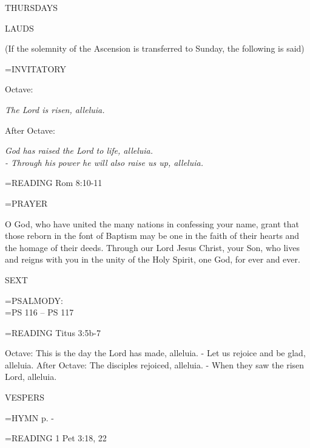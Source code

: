 \begin{center}\normalsize THURSDAYS\\
\end{center}

\begin{flushleft}\normalsize LAUDS\\\end{flushleft}
(If the solemnity of the Ascension is transferred to Sunday, the following is said)

\hangindent=\parindent \small{INVITATORY}
\begin{center}
\end{center}Octave:\begin{center}\textit{	The Lord is risen, alleluia.\\}
\end{center}After Octave:\begin{center}\textit{	God has raised the Lord to life, alleluia.\\}
\textit{- Through his power he will also raise us up, alleluia.\\}
\end{center}

\hangindent=\parindent \small{\uppercase{READING}}    Rom 8:10-11 \textbf{   \\}

\hangindent=\parindent \small PRAYER
\begin{description}[labelindent=\parindent, leftmargin=*]
\item [Octave:] 	O God, who have united the many nations in confessing your name, grant that those reborn in the font of Baptism may be one in the faith of their hearts and the homage of their deeds. Through our Lord Jesus Christ, your Son, who lives and reigns with you in the unity of the Holy Spirit, one God, for ever and ever.
\item [After Octave:] 	
\end{description}

\begin{flushleft}\normalsize SEXT\\\end{flushleft}

\hangindent=\parindent \small{PSALMODY:}\\
\hangindent=\parindent  PS 116 -- PS 117\vspace{0.5em}

\hangindent=\parindent \small{\uppercase{READING}}    Titus 3:5b-7 \textbf{   \\}

Octave:	This is the day the Lord has made, alleluia.
- Let us rejoice and be glad, alleluia.
After Octave:	The disciples rejoiced, alleluia.
- When they saw the risen Lord, alleluia.

\begin{flushleft}\normalsize VESPERS\\\end{flushleft}

\hangindent=\parindent \small{\uppercase{HYMN} p. \pageref{easter:firstHymn}-\pageref{easter:lastHymn}\\}

\hangindent=\parindent \small{\uppercase{READING}}    1 Pet 3:18, 22 \textbf{   \\}
